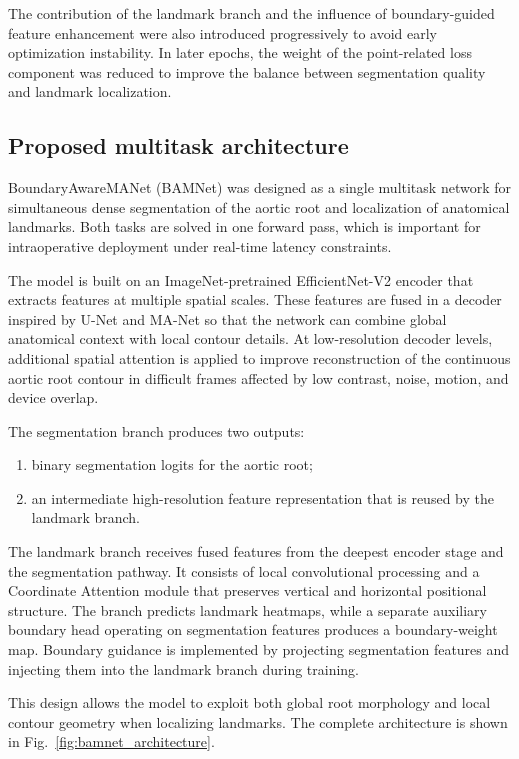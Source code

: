 \documentclass[oneside,pdflatex,sn-mathphys-num]{sn-jnl}
\begin{document}
The contribution of the landmark branch and the influence of boundary-guided feature enhancement were also introduced progressively to avoid early optimization instability. In later epochs, the weight of the point-related loss component was reduced to improve the balance between segmentation quality and landmark localization.

\subsection{Proposed multitask architecture}\label{subsec:architecture}

BoundaryAwareMANet (BAMNet) was designed as a single multitask network for simultaneous dense segmentation of the aortic root and localization of anatomical landmarks. Both tasks are solved in one forward pass, which is important for intraoperative deployment under real-time latency constraints.

The model is built on an ImageNet-pretrained EfficientNet-V2 encoder that extracts features at multiple spatial scales. These features are fused in a decoder inspired by U-Net and MA-Net so that the network can combine global anatomical context with local contour details. At low-resolution decoder levels, additional spatial attention is applied to improve reconstruction of the continuous aortic root contour in difficult frames affected by low contrast, noise, motion, and device overlap.

The segmentation branch produces two outputs:
\begin{enumerate}
\item binary segmentation logits for the aortic root;
\item an intermediate high-resolution feature representation that is reused by the landmark branch.
\end{enumerate}

The landmark branch receives fused features from the deepest encoder stage and the segmentation pathway. It consists of local convolutional processing and a Coordinate Attention module that preserves vertical and horizontal positional structure. The branch predicts landmark heatmaps, while a separate auxiliary boundary head operating on segmentation features produces a boundary-weight map. Boundary guidance is implemented by projecting segmentation features and injecting them into the landmark branch during training.

This design allows the model to exploit both global root morphology and local contour geometry when localizing landmarks. The complete architecture is shown in Fig.~\ref{fig:bamnet_architecture}.
\end{document}
